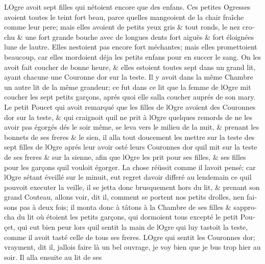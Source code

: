\documentclass[14pt,a4paper]{memoir}
\begin{document}
\begin{otherlanguage}{french}
L\textquotesingle Ogre avoit sept filles qui n\textquotesingle étoient
encore que des enfans. Ces petites Ogresses avoient toutes le teint fort
beau, parce qu\textquotesingle elles mangeoient de la chair fraîche
comme leur pere; mais elles avoient de petits yeux gris \& tout ronds,
le nez crochu \& une fort grande bouche avec de longues dents fort
aiguës \& fort éloignées l\textquotesingle une de
l\textquotesingle autre. Elles n\textquotesingle estoient pas encore
fort méchantes; mais elles promettoient beaucoup, car elles mordoient
déja les petits enfans pour en succer le sang. On les avoit fait coucher
de bonne heure, \& elles estoient toutes sept dans un grand lit, ayant
chacune une Couronne d\textquotesingle or sur la teste. Il y avoit dans
la même Chambre un autre lit de la même grandeur; ce fut dans ce lit que
la femme de l\textquotesingle Ogre mit coucher les sept petits garçons,
aprés quoi elle s\textquotesingle alla coucher auprés de son mary. Le
petit Poucet qui avoit remarqué que les filles de l\textquotesingle Ogre
avoient des Couronnes d\textquotesingle or sur la teste, \& qui
craignoit qu\textquotesingle il ne prit à l\textquotesingle Ogre
quelques remords de ne les avoir pas égorgés dés le soir même, se leva
vers le milieu de la nuit, \& prenant les bonnets de ses freres \& le
sien, il alla tout doucement les mettre sur la teste des sept filles de
l\textquotesingle Ogre aprés leur avoir osté leurs Couronnes
d\textquotesingle or qu\textquotesingle il mit sur la teste de ses
freres \& sur la sienne, afin que l\textquotesingle Ogre les prit pour
ses filles, \& ses filles pour les garçons qu\textquotesingle il vouloit
égorger. La chose réüssit comme il l\textquotesingle avoit pensé; car
l\textquotesingle Ogre s\textquotesingle étant éveillé sur le minuit,
eut regret d\textquotesingle avoir differé au lendemain ce
qu\textquotesingle il pouvoit executer la veille, il se jetta donc
brusquement hors du lit, \& prenant son grand Couteau, allons voir, dit
il, comment se portent nos petits drolles, n\textquotesingle en faisons
pas à deux fois; il monta donc à tâtons à la Chambre de ses filles \&
s\textquotesingle approcha du lit où étoient les petits garçons, qui
dormoient tous excepté le petit Pouçet, qui eut bien peur lors
qu\textquotesingle il sentit la main de l\textquotesingle Ogre qui luy
tastoit la teste, comme il avoit tasté celle de tous ses freres.
L\textquotesingle Ogre qui sentit les Couronnes d\textquotesingle or;
vrayment, dit il, j\textquotesingle allois faire là un bel ouvrage, je
voy bien que je bus trop hier au soir. Il alla ensuite au lit de ses

\end{otherlanguage}
\end{document}
